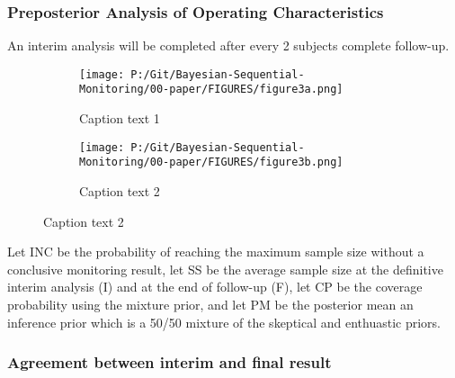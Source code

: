 \documentclass[12pt]{article}
\begin{document}
\newpage
\subsubsection{Preposterior Analysis of Operating Characteristics}
An interim analysis will be completed after every 2 subjects complete follow-up.
\begin{figure}
  \begin{subfigure}{6cm}
    \centering\texttt{[image: P:/Git/Bayesian-Sequential-Monitoring/00-paper/FIGURES/figure3a.png]}
    \caption{Caption text 1}
  \end{subfigure}
  \begin{subfigure}{6cm}
    \centering\texttt{[image: P:/Git/Bayesian-Sequential-Monitoring/00-paper/FIGURES/figure3b.png]}
    \caption{Caption text 2}
  \end{subfigure}
 
\end{figure}

Let INC be the probability of reaching the maximum sample size without a conclusive monitoring result, let SS be the average sample size at the definitive interim analysis (I) and at the end of follow-up (F), let CP be the coverage probability using the mixture prior, and let PM be the posterior mean an inference prior which is a 50/50 mixture of the skeptical and enthuastic priors.
\subsubsection{Agreement between interim and final result}


\end{document}

